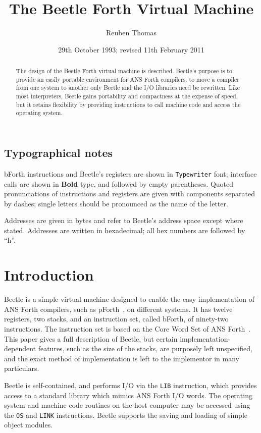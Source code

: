 \documentclass{article}
\title{The Beetle Forth Virtual Machine}
\author{Reuben Thomas}
\date{29th October 1993; revised 11th February 2011}
\newlength{\pronunc}\pronunc=1.7in
\begin{document}
\maketitle

\begin{abstract}
\noindent The design of the Beetle Forth virtual machine is described.
Beetle's purpose is to provide an easily portable environment for ANS Forth
compilers: to move a compiler from one system to another only Beetle and the I/O
libraries need be rewritten. Like most interpreters, Beetle gains portability
and compactness at the expense of speed, but it retains flexibility by providing
instructions to call machine code and access the operating system.
\end{abstract}


\subsection*{Typographical notes}

bForth instructions and Beetle's registers are shown in {\tt Typewriter} font;
interface calls are shown in {\bf Bold} type, and followed by empty parentheses.
Quoted pronunciations of instructions and registers are given with components
separated by dashes; single letters should be pronounced as the name of the
letter.

Addresses are given in bytes and refer to Beetle's address space except where
stated. Addresses are written in hexadecimal; all hex numbers are followed by
``h''.


\section{Introduction}

Beetle is a simple virtual machine designed to enable the easy implementation
of ANS Forth compilers, such as pForth~\cite{beetledis}, on different systems.
It has twelve registers, two stacks, and an instruction set, called bForth, of
ninety-two instructions. The instruction set is based on the Core Word Set of
ANS Forth~\cite{ANSIforth}. This paper gives a full description of Beetle, but
certain implementation-dependent features, such as the size of the stacks, are
purposely left unspecified, and the exact method of implementation is left to
the implementor in many particulars.

Beetle is self-contained, and performs I/O via the {\tt LIB} instruction, which
provides access to a standard library which mimics ANS Forth I/O words. The
operating system and machine code routines on the host computer may be accessed
using the {\tt OS} and {\tt LINK} instructions. Beetle supports the saving and
loading of simple object modules.
\end{document}
